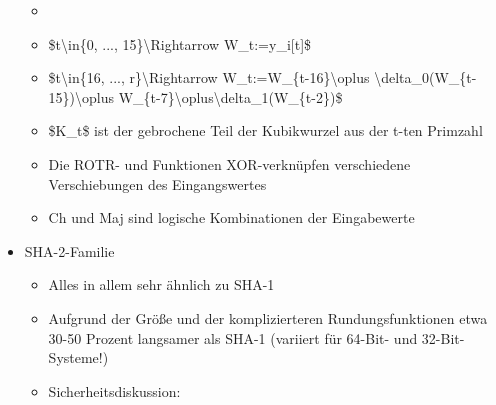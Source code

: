 \documentclass[a4paper]{article}
\begin{document}
\begin{multicols}{3}
\begin{itemize}
              \begin{itemize}
                  \item
                  \item
                        \$t\textbackslash in\{0, ..., 15\}\textbackslash Rightarrow
                        W\_t:=y\_i{[}t{]}\$
                  \item
                        \$t\textbackslash in\{16, ..., r\}\textbackslash Rightarrow
                        W\_t:=W\_\{t-16\}\textbackslash oplus
                        \textbackslash delta\_0(W\_\{t-15\})\textbackslash oplus
                        W\_\{t-7\}\textbackslash oplus\textbackslash delta\_1(W\_\{t-2\})\$
                  \item
                        \$K\_t\$ ist der gebrochene Teil der Kubikwurzel aus der t-ten
                        Primzahl
                  \item
                        Die ROTR- und Funktionen XOR-verknüpfen verschiedene Verschiebungen
                        des Eingangswertes
                  \item
                        Ch und Maj sind logische Kombinationen der Eingabewerte
              \end{itemize}
        \item
              SHA-2-Familie

              \begin{itemize}
                  \item
                        Alles in allem sehr ähnlich zu SHA-1
                  \item
                        Aufgrund der Größe und der komplizierteren Rundungsfunktionen etwa
                        30-50 Prozent langsamer als SHA-1 (variiert für 64-Bit- und
                        32-Bit-Systeme!)
                  \item
                        Sicherheitsdiskussion:


\end{itemize}
\end{itemize}
\end{multicols}
\end{document}
